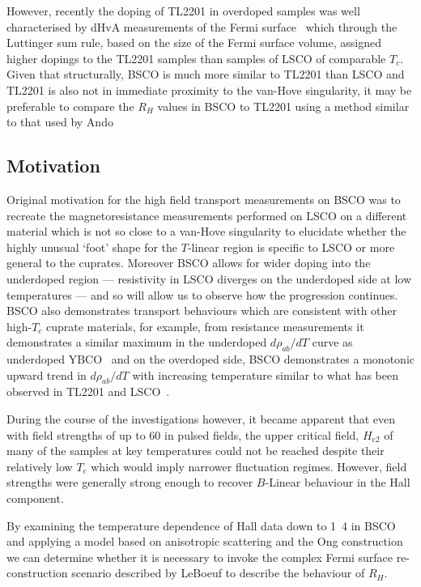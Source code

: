 However, recently the doping of \ac{TL2201} in overdoped samples was well characterised by \ac{dHvA} measurements of the Fermi surface~\cite{Rourke2010b} which through the Luttinger sum rule, based on the size of the Fermi surface volume, assigned higher dopings to the \ac{TL2201} samples than samples of \ac{LSCO} of comparable $T_c$. Given that structurally, \ac{BSCO} is much more similar to \ac{TL2201} than \ac{LSCO} and \ac{TL2201} is also not in immediate proximity to the van-Hove singularity, it may be preferable to compare the $R_H$ values in \ac{BSCO} to \ac{TL2201} using a method similar to that used by Ando \etal

\subsection{Motivation}

Original motivation for the high field transport measurements on \ac{BSCO} was to recreate the magnetoresistance measurements performed on \ac{LSCO} on a different material which is not so close to a van-Hove singularity to elucidate whether the highly unusual `foot' shape for the $T$-linear region is specific to \ac{LSCO} or more general to the cuprates. Moreover \ac{BSCO} allows for wider doping into the underdoped region --- resistivity in \ac{LSCO} diverges on the underdoped side at low temperatures --- and so will allow us to observe how the progression continues.  \ac{BSCO} also demonstrates transport behaviours which are consistent with other high-$T_c$ cuprate materials, for example, from resistance measurements it demonstrates a similar maximum in the underdoped $d\rho_{ab}/dT$ curve as underdoped YBCO~\cite{Ando1999} and on the overdoped side, \ac{BSCO} demonstrates a monotonic upward trend in $d\rho_{ab}/dT$ with increasing temperature similar to what has been observed in \ac{TL2201} and \ac{LSCO}~\cite{Ando1999}.

During the course of the investigations however, it became apparent that even with field strengths of up to \unit{60}{\tesla} in pulsed fields, the upper critical field, $H_{\textrm{c2}}$ of many of the samples at key temperatures could not be reached despite their relatively low $T_c$ which would imply narrower fluctuation regimes. However, field strengths were generally strong enough to recover $B$-Linear behaviour in the Hall component.

By examining the temperature dependence of Hall data down to \unit{1.4}{\kelvin} in \ac{BSCO} and applying a model based on anisotropic scattering and the Ong construction we can determine whether it is necessary to invoke the complex Fermi surface re-construction scenario described by LeBoeuf \etal to describe the behaviour of $R_H$.

